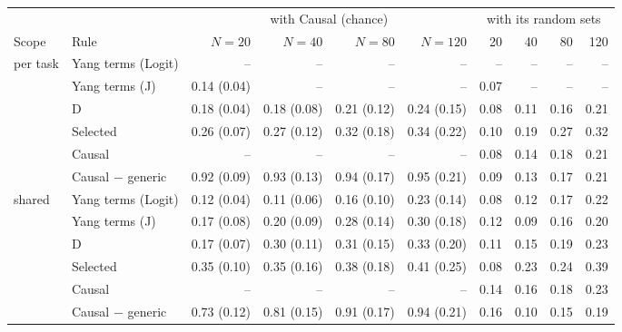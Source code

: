 \begin{tabular}{@{}llrrrrrrrr@{}}
\toprule
& & \multicolumn{4}{c}{with Causal (chance)} & \multicolumn{4}{c}{with its random sets} \\
\cmidrule(lr){3-6} \cmidrule(lr){7-10}
Scope & Rule & $N=20$ & $N=40$ & $N=80$ & $N=120$ & 20 & 40 & 80 & 120 \\
\midrule
per task & Yang terms (Logit) & -- & -- & -- & -- & -- & -- & -- & -- \\
 & Yang terms (J) & 0.14 (0.04) & -- & -- & -- & 0.07 & -- & -- & -- \\
 & D & 0.18 (0.04) & 0.18 (0.08) & 0.21 (0.12) & 0.24 (0.15) & 0.08 & 0.11 & 0.16 & 0.21 \\
 & Selected & 0.26 (0.07) & 0.27 (0.12) & 0.32 (0.18) & 0.34 (0.22) & 0.10 & 0.19 & 0.27 & 0.32 \\
 & Causal & -- & -- & -- & -- & 0.08 & 0.14 & 0.18 & 0.21 \\
 & Causal $-$ generic & 0.92 (0.09) & 0.93 (0.13) & 0.94 (0.17) & 0.95 (0.21) & 0.09 & 0.13 & 0.17 & 0.21 \\
\midrule
shared & Yang terms (Logit) & 0.12 (0.04) & 0.11 (0.06) & 0.16 (0.10) & 0.23 (0.14) & 0.08 & 0.12 & 0.17 & 0.22 \\
 & Yang terms (J) & 0.17 (0.08) & 0.20 (0.09) & 0.28 (0.14) & 0.30 (0.18) & 0.12 & 0.09 & 0.16 & 0.20 \\
 & D & 0.17 (0.07) & 0.30 (0.11) & 0.31 (0.15) & 0.33 (0.20) & 0.11 & 0.15 & 0.19 & 0.23 \\
 & Selected & 0.35 (0.10) & 0.35 (0.16) & 0.38 (0.18) & 0.41 (0.25) & 0.08 & 0.23 & 0.24 & 0.39 \\
 & Causal & -- & -- & -- & -- & 0.14 & 0.16 & 0.18 & 0.23 \\
 & Causal $-$ generic & 0.73 (0.12) & 0.81 (0.15) & 0.91 (0.17) & 0.94 (0.21) & 0.16 & 0.10 & 0.15 & 0.19 \\
\bottomrule
\end{tabular}

